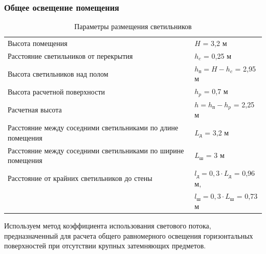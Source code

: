 \subsubsection{Общее освещение помещения}

\begin{table}[ht]
    \renewcommand{\tabularxcolumn}[1]{m{#1}}

    \centering
    \begin{tabularx}{\textwidth}{L|L}
        \hline
        Высота помещения                                                        & $H$ = 3,2 м                                   \\
        Расстояние светильников от перекрытия                                   & $h_c$ = 0,25 м                                \\
        Высота светильников над полом                                           & $h_\text{п} = H - h_c$ = 2,95 м               \\
        Высота расчетной поверхности                                            & $h_p$ = 0,7 м                                 \\
        Расчетная высота                                                        & $h = h_\text{п} - h_p$ = 2,25 м               \\
        Расстояние между соседними светильниками по длине помещения             & $L_\text{д}$ = 3,2 м                          \\
        Расстояние между соседними светильниками по ширине помещения            & $L_\text{ш}$ = 3 м                            \\
        Расстояние от крайних светильников до стены                             & $l_\text{д} = 0,3 \cdot L_\text{д}$ = 0,96 м, \\
                                                                                & $l_\text{ш} = 0,3 \cdot L_\text{ш}$ = 0,73 м  \\
        \hline
    \end{tabularx}
    \caption{Параметры размещения светильников}
    \label{lamps_arrangement_parameters}
\end{table}

Используем метод коэффициента использования светового потока, предназначенный для
расчета общего равномерного освещения горизонтальных поверхностей при отсутствии
крупных затемняющих предметов.

